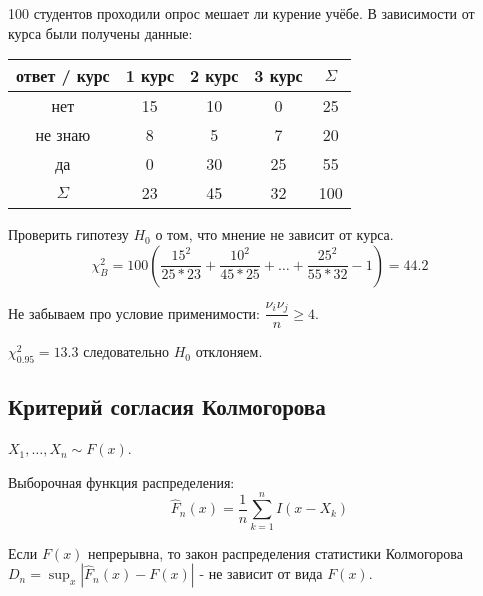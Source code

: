 \begin{ex}
  100 студентов проходили опрос мешает ли курение учёбе.
  В зависимости от курса были получены данные:

  \begin{center}
    \begin{tabular}{|c|c|c|c|c|}
      \hline
      ответ / курс & 1 курс & 2 курс & 3 курс & $ \Sigma $ \\
      \hline
      нет & 15 & 10 & 0 & 25\\
      \hline
      не знаю & 8 & 5 & 7 & 20 \\
      \hline
      да & 0 & 30 & 25 & 55 \\
      \hline
      $ \Sigma $  & 23 & 45 & 32 & 100 \\
      \hline
    \end{tabular}
  \end{center}

  Проверить гипотезу $H_0$ о том, что мнение не зависит от курса.
  \[
  \chi^2_B = 100 (\dfrac{15^2}{25*23} + \dfrac{10^2}{45*25} + \dots + \dfrac{25^2}{55*32} - 1) = 44.2
  \]

  Не забываем про условие применимости: $\dfrac{\nu_i \nu_j}{n} \geqslant 4$.

  $\chi^2_{0.95} = 13.3$ следовательно $H_0$ отклоняем.
\end{ex}

\subsection{Критерий согласия Колмогорова}

\begin{theorem}
  $X_1, \dots, X_n \sim F(x)$.

  Выборочная функция распределения:
  \[
    \hat F_n(x) = \dfrac{1}{n} \sum_{k=1}^n I(x-X_k)
  \]

  Если $F(x)$ непрерывна, то закон распределения статистики Колмогорова $D_n = \sup_x |\hat F_n(x) - F(x)|$ - не зависит от вида $F(x)$.
\end{theorem}

